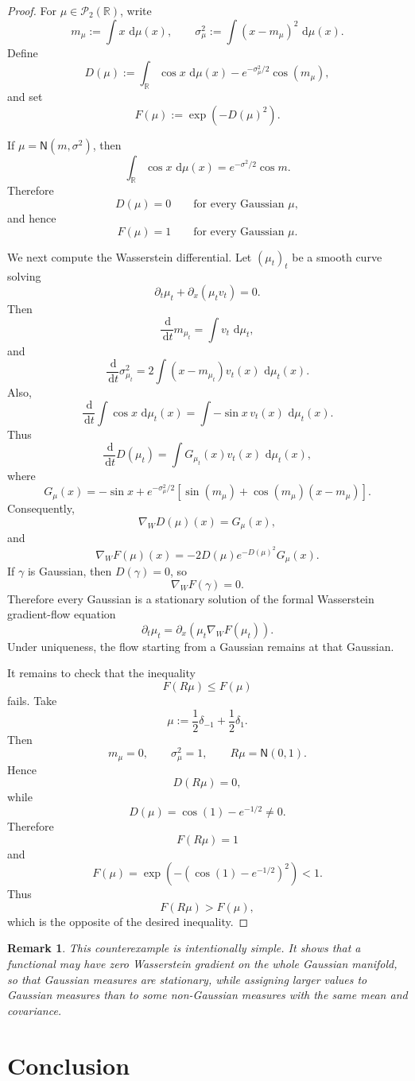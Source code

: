 \documentclass[11pt]{article}
\newtheorem{remark}{Remark}
\newcommand{\R}{\mathbb R}
\newcommand{\N}{\mathsf N}
\newcommand{\dd}{\,\mathrm d}
\begin{document}
\begin{proof}
For $\mu\in\mathcal P_2(\R)$, write
\[
m_\mu:=\int x\,\dd\mu(x),
\qquad
\sigma_\mu^2:=\int (x-m_\mu)^2\,\dd\mu(x).
\]
Define
\[
D(\mu)
:=
\int_{\R}\cos x\,\dd\mu(x)
-
e^{-\sigma_\mu^2/2}\cos(m_\mu),
\]
and set
\[
F(\mu):=\exp(-D(\mu)^2).
\]

If $\mu=\N(m,\sigma^2)$, then
\[
\int_{\R}\cos x\,\dd\mu(x)
=
e^{-\sigma^2/2}\cos m.
\]
Therefore
\[
D(\mu)=0
\qquad
\text{for every Gaussian }\mu,
\]
and hence
\[
F(\mu)=1
\qquad
\text{for every Gaussian }\mu.
\]

We next compute the Wasserstein differential. Let $(\mu_t)_{t}$ be a smooth
curve solving
\[
\partial_t\mu_t+\partial_x(\mu_t v_t)=0.
\]
Then
\[
\frac{\dd}{\dd t}m_{\mu_t}
=
\int v_t\,\dd\mu_t,
\]
and
\[
\frac{\dd}{\dd t}\sigma_{\mu_t}^2
=
2\int (x-m_{\mu_t})v_t(x)\,\dd\mu_t(x).
\]
Also,
\[
\frac{\dd}{\dd t}\int\cos x\,\dd\mu_t(x)
=
\int -\sin x\,v_t(x)\,\dd\mu_t(x).
\]
Thus
\[
\frac{\dd}{\dd t}D(\mu_t)
=
\int G_{\mu_t}(x)v_t(x)\,\dd\mu_t(x),
\]
where
\[
G_\mu(x)
=
-\sin x
+
e^{-\sigma_\mu^2/2}
\left[
\sin(m_\mu)+\cos(m_\mu)(x-m_\mu)
\right].
\]
Consequently,
\[
\nabla_W D(\mu)(x)=G_\mu(x),
\]
and
\[
\nabla_WF(\mu)(x)
=
-2D(\mu)e^{-D(\mu)^2}G_\mu(x).
\]
If $\gamma$ is Gaussian, then $D(\gamma)=0$, so
\[
\nabla_WF(\gamma)=0.
\]
Therefore every Gaussian is a stationary solution of the formal Wasserstein
gradient-flow equation
\[
\partial_t\mu_t
=
\partial_x\left(\mu_t\nabla_WF(\mu_t)\right).
\]
Under uniqueness, the flow starting from a Gaussian remains at that Gaussian.

It remains to check that the inequality
\[
F(R\mu)\le F(\mu)
\]
fails. Take
\[
\mu:=\frac12\delta_{-1}+\frac12\delta_1.
\]
Then
\[
m_\mu=0,
\qquad
\sigma_\mu^2=1,
\qquad
R\mu=\N(0,1).
\]
Hence
\[
D(R\mu)=0,
\]
while
\[
D(\mu)
=
\cos(1)-e^{-1/2}
\neq 0.
\]
Therefore
\[
F(R\mu)=1
\]
and
\[
F(\mu)
=
\exp\left(-(\cos(1)-e^{-1/2})^2\right)
<1.
\]
Thus
\[
F(R\mu)>F(\mu),
\]
which is the opposite of the desired inequality.
\end{proof}

\begin{remark}
This counterexample is intentionally simple. It shows that a functional may have
zero Wasserstein gradient on the whole Gaussian manifold, so that Gaussian
measures are stationary, while assigning larger values to Gaussian measures
than to some non-Gaussian measures with the same mean and covariance.
\end{remark}

\section{Conclusion}
\end{document}
